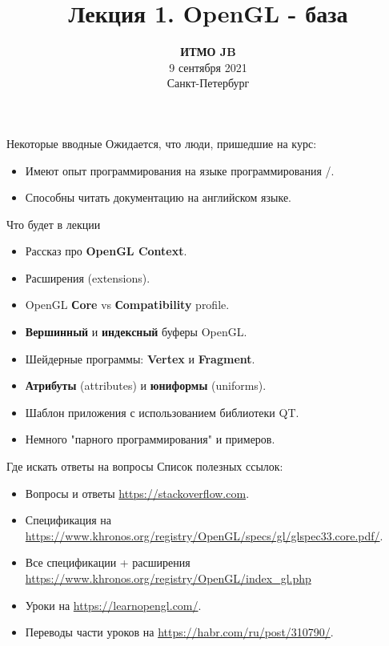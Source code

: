 \documentclass[aspectration=1610,t]{beamer}
\title{Лекция 1. OpenGL - база}
\date{
   \textbf{ИТМО JB}\\
   9 сентября 2021\\
   Санкт-Петербург
}
\begin{document}
\begin{frame}
  \titlepage
\end{frame}

\begin{frame}[fragile]{Некоторые вводные}
    Ожидается, что люди, пришедшие на курс:
    \begin{itemize}
        \item Имеют опыт программирования на языке программирования \langc/\langcpp.
        \item Способны читать документацию на английском языке.
    \end{itemize}
\end{frame}

\begin{frame}[fragile]{Что будет в лекции}
    \begin{itemize}
        \item Рассказ про {\bf OpenGL Context}.
        \item Расширения (extensions).
        \item OpenGL {\bf Сore} vs {\bf Сompatibility} profile.
        \item {\bf Вершинный} и {\bf индексный} буферы OpenGL.
        \item Шейдерные программы: {\bf Vertex} и {\bf Fragment}.
        \item {\bf Атрибуты} (attributes) и {\bf юниформы} (uniforms).
        \item Шаблон приложения с использованием библиотеки QT.
        \item Немного "парного программирования" и примеров.
    \end{itemize}
\end{frame}

\begin{frame}[fragile]{Где искать ответы на вопросы}
    Список полезных ссылок:
    \begin{itemize}
        \item Вопросы и ответы \url{https://stackoverflow.com}.
        \item Спецификация на \url{https://www.khronos.org/registry/OpenGL/specs/gl/glspec33.core.pdf/}.
        \item Все спецификации + расширения \url{https://www.khronos.org/registry/OpenGL/index_gl.php}
        \item Уроки на \url{https://learnopengl.com/}.
        \item Переводы части уроков на \url{https://habr.com/ru/post/310790/}.
    \end{itemize}
\end{frame}
\end{document}
